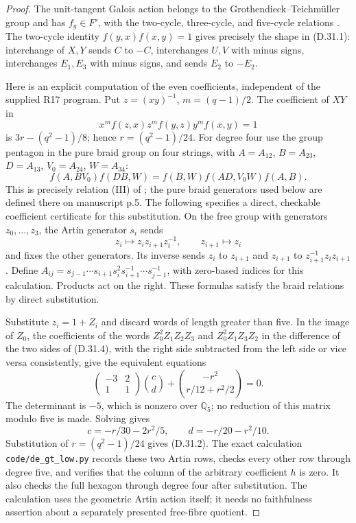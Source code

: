 \begin{proof}
The unit-tangent Galois action belongs to the
Grothendieck--Teichm\"uller group and has
\(f_g\in F'\), with the two-cycle, three-cycle,
and five-cycle relations
\cite[\S1]{DE_Ihara2000}. The two-cycle identity
\(f(y,x)f(x,y)=1\) gives precisely the shape
in (D.31.1): interchange of \(X,Y\) sends
\(C\) to \(-C\), interchanges \(U,V\) with
minus signs, interchanges \(E_1,E_3\) with
minus signs, and sends \(E_2\) to \(-E_2\).

Here is an explicit computation of the even
coefficients, independent of the supplied R17
program. Put \(z=(xy)^{-1}\), \(m=(q-1)/2\).
The coefficient of \(XY\) in
\[
 x^m f(z,x)z^m f(y,z)y^m f(x,y)=1
\]
is \(3r-(q^2-1)/8\); hence
\(r=(q^2-1)/24\). For degree four use the
group pentagon in the pure braid group on four
strings, with \(A=A_{12}\), \(B=A_{23}\),
\(D=A_{13}\), \(V_0=A_{24}\), \(W=A_{34}\):
\[
 f(A,BV_0)f(DB,W)
       =f(B,W)f(AD,V_0W)f(A,B).                 \tag{D.31.4}
\]
This is precisely relation (III) of
\cite[\S1, manuscript p.4]{DE_LochakSchneps1994};
the pure braid generators used below are
defined there on manuscript p.5.
The following specifies a direct, checkable
coefficient certificate for this substitution.
On the free group with generators \(z_0,\ldots,z_3\),
the Artin generator \(s_i\) sends
\[
 z_i\longmapsto z_i z_{i+1}z_i^{-1},\qquad
 z_{i+1}\longmapsto z_i
\]
and fixes the other generators. Its inverse sends
\(z_i\) to \(z_{i+1}\) and \(z_{i+1}\) to
\(z_{i+1}^{-1}z_i z_{i+1}\). Define
\(A_{ij}=s_{j-1}\cdots s_{i+1}s_i^2
s_{i+1}^{-1}\cdots s_{j-1}^{-1}\), with
zero-based indices for this calculation. Products
act on the right. These formulas satisfy the
braid relations by direct substitution.

Substitute \(z_i=1+Z_i\) and discard words of
length greater than five. In the image of \(Z_0\),
the coefficients of the words \(Z_0^2Z_1Z_2Z_3\)
and \(Z_0^2Z_1Z_3Z_2\) in the difference of the
two sides of (D.31.4), with the right side
subtracted from the left side or vice versa
consistently, give the equivalent equations
\[
 \begin{pmatrix}-3&2\\1&1\end{pmatrix}
       \binom{c}{d}
       +\binom{-r^2}{r/12+r^2/2}=0.             \tag{D.31.5}
\]
The determinant is \(-5\), which is nonzero
over \(\mathbb Q_5\); no reduction of this
matrix modulo five is made. Solving gives
\[
       c=-r/30-2r^2/5,\qquad
       d=-r/20-r^2/10.
\]
Substitution of \(r=(q^2-1)/24\) gives
(D.31.2). The exact calculation
\texttt{code/de\_gt\_low.py} records these two
Artin rows, checks every other row through
degree five, and verifies that the column of
the arbitrary coefficient \(h\) is zero.
It also checks the full hexagon through degree
four after substitution. The calculation uses
the geometric Artin action itself; it needs no
faithfulness assertion about a separately
presented free-fibre quotient.


\end{proof}
